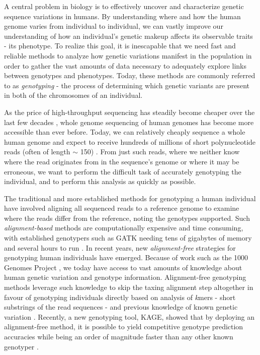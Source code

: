 A central problem in biology is to effectively uncover and characterize genetic sequence variations in humans.
By understanding where and how the human genome varies from individual to individual, we can vastly improve our understanding of how an individual's genetic makeup affects its observable traits - its phenotype.
To realize this goal, it is inescapable that we need fast and reliable methods to analyze how genetic variations manifest in the population in order to gather the vast amounts of data necessary to adequately explore links between genotypes and phenotypes.
Today, these methods are commonly referred to as \textit{genotyping} - the process of determining which genetic variants are present in both of the chromosomes of an individual.

As the price of high-throughput sequencing has steadily become cheaper over the last few decades \cite{nhgri_sequencing_cost}, whole genome sequencing of human genomes has become more accessible than ever before.
Today, we can relatively cheaply sequence a whole human genome and expect to receive hundreds of millions of short polynucleotide reads (often of length $\sim$ 150) \cite{illumina_read_length}.
From just such reads, where we neither know where the read originates from in the sequence's genome or where it may be erroneous, we want to perform the difficult task of accurately genotyping the individual, and to perform this analysis as quickly as possible.

The traditional and more established methods for genotyping a human individual have involved aligning all sequenced reads to a reference genome to examine where the reads differ from the reference, noting the genotypes supported.
Such \textit{alignment-based} methods are computationally expensive and time consuming, with established genotypers such as GATK \cite{gatk} needing tens of gigabytes of memory and several hours to run \cite{kage}.
In recent years, new \textit{alignment-free} strategies for genotyping human individuals have emerged.
Because of work such as the 1000 Genomes Project \cite{1000_genomes_project}, we today have access to vast amounts of knowledge about human genetic variation and genotype information.
Alignment-free genotyping methods leverage such knowledge to skip the taxing alignment step altogether in favour of genotyping individuals directly based on analysis of \textit{k}mers - short substrings of the read sequences - and previous knowledge of known genetic variation \cite{kage,malva}.
Recently, a new genotyping tool, KAGE, showed that by deploying an alignment-free method, it is possible to yield competitive genotype prediction accuracies while being an order of magnitude faster than any other known genotyper \cite{kage}.

